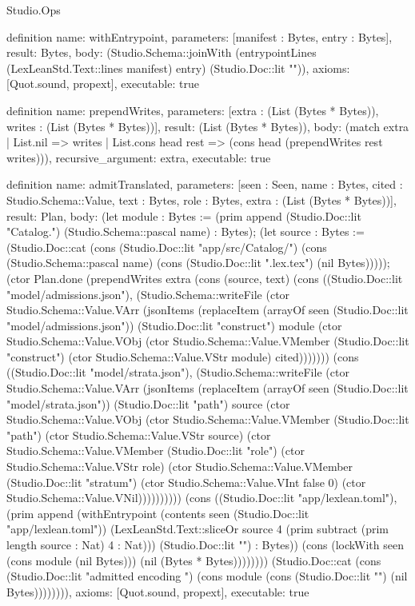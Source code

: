 \begin{lexlean}{Studio.Ops}
\begin{semanticmodule}
definition{
  name: withEntrypoint,
  parameters: [manifest : Bytes, entry : Bytes],
  result: Bytes,
  body: (Studio.Schema::joinWith (entrypointLines (LexLeanStd.Text::lines manifest) entry) (Studio.Doc::lit "\n")),
  axioms: [Quot.sound, propext],
  executable: true
}


definition{
  name: prependWrites,
  parameters: [extra : (List (Bytes * Bytes)), writes : (List (Bytes * Bytes))],
  result: (List (Bytes * Bytes)),
  body: (match extra
    | List.nil => writes
    | List.cons head rest => (cons head (prependWrites rest writes))),
  recursive_argument: extra,
  executable: true
}

definition{
  name: admitTranslated,
  parameters: [seen : Seen, name : Bytes, cited : Studio.Schema::Value, text : Bytes, role : Bytes, extra : (List (Bytes * Bytes))],
  result: Plan,
  body: (let module : Bytes := (prim append (Studio.Doc::lit "Catalog.") (Studio.Schema::pascal name) : Bytes); (let source : Bytes := (Studio.Doc::cat (cons (Studio.Doc::lit "app/src/Catalog/") (cons (Studio.Schema::pascal name) (cons (Studio.Doc::lit ".lex.tex") (nil Bytes))))); (ctor Plan.done (prependWrites extra (cons (source, text) (cons ((Studio.Doc::lit "model/admissions.json"), (Studio.Schema::writeFile (ctor Studio.Schema::Value.VArr (jsonItems (replaceItem (arrayOf seen (Studio.Doc::lit "model/admissions.json")) (Studio.Doc::lit "construct") module (ctor Studio.Schema::Value.VObj (ctor Studio.Schema::Value.VMember (Studio.Doc::lit "construct") (ctor Studio.Schema::Value.VStr module) cited))))))) (cons ((Studio.Doc::lit "model/strata.json"), (Studio.Schema::writeFile (ctor Studio.Schema::Value.VArr (jsonItems (replaceItem (arrayOf seen (Studio.Doc::lit "model/strata.json")) (Studio.Doc::lit "path") source (ctor Studio.Schema::Value.VObj (ctor Studio.Schema::Value.VMember (Studio.Doc::lit "path") (ctor Studio.Schema::Value.VStr source) (ctor Studio.Schema::Value.VMember (Studio.Doc::lit "role") (ctor Studio.Schema::Value.VStr role) (ctor Studio.Schema::Value.VMember (Studio.Doc::lit "stratum") (ctor Studio.Schema::Value.VInt false 0) (ctor Studio.Schema::Value.VNil)))))))))) (cons ((Studio.Doc::lit "app/lexlean.toml"), (prim append (withEntrypoint (contents seen (Studio.Doc::lit "app/lexlean.toml")) (LexLeanStd.Text::sliceOr source 4 (prim subtract (prim length source : Nat) 4 : Nat))) (Studio.Doc::lit "\n") : Bytes)) (cons (lockWith seen (cons module (nil Bytes))) (nil (Bytes * Bytes)))))))) (Studio.Doc::cat (cons (Studio.Doc::lit "admitted encoding ") (cons module (cons (Studio.Doc::lit "\n") (nil Bytes)))))))),
  axioms: [Quot.sound, propext],
  executable: true
}


\end{semanticmodule}
\end{lexlean}
